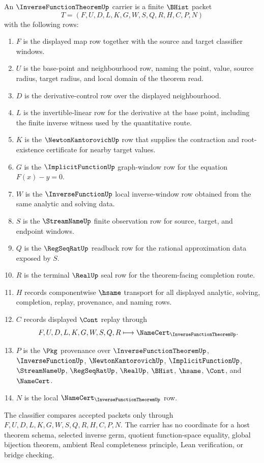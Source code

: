 \begin{definition}
\label{def:inverse-function-theorem-carrier}
An $\InverseFunctionTheoremUp$ carrier is a finite $\BHist$ packet
$$
T=(F,U,D,L,K,G,W,S,Q,R,H,C,P,N)
$$
with the following rows:
\begin{enumerate}
\item $F$ is the displayed map row together with the source and target classifier windows.
\item $U$ is the base-point and neighbourhood row, naming the point, value, source radius, target radius, and local domain of the theorem read.
\item $D$ is the derivative-control row over the displayed neighbourhood.
\item $L$ is the invertible-linear row for the derivative at the base point, including the finite inverse witness used by the quantitative route.
\item $K$ is the $\NewtonKantorovichUp$ row that supplies the contraction and root-existence certificate for nearby target values.
\item $G$ is the $\ImplicitFunctionUp$ graph-window row for the equation $F(x)-y=0$.
\item $W$ is the $\InverseFunctionUp$ local inverse-window row obtained from the same analytic and solving data.
\item $S$ is the $\StreamNameUp$ finite observation row for source, target, and endpoint windows.
\item $Q$ is the $\RegSeqRatUp$ readback row for the rational approximation data exposed by $S$.
\item $R$ is the terminal $\RealUp$ seal row for the theorem-facing completion route.
\item $H$ records componentwise $\hsame$ transport for all displayed analytic, solving, completion, replay, provenance, and naming rows.
\item $C$ records displayed $\Cont$ replay through
$$
F,U,D,L,K,G,W,S,Q,R \longmapsto \NameCert_{\InverseFunctionTheoremUp}.
$$
\item $P$ is the $\Pkg$ provenance over $\InverseFunctionTheoremUp$, $\InverseFunctionUp$, $\NewtonKantorovichUp$, $\ImplicitFunctionUp$, $\StreamNameUp$, $\RegSeqRatUp$, $\RealUp$, $\BHist$, $\hsame$, $\Cont$, and $\NameCert$.
\item $N$ is the local $\NameCert_{\InverseFunctionTheoremUp}$ row.
\end{enumerate}
The classifier compares accepted packets only through $F,U,D,L,K,G,W,S,Q,R,H,C,P,N$. The carrier has no coordinate for a host theorem schema, selected inverse germ, quotient function-space equality, global bijection theorem, ambient Real completeness principle, Lean verification, or bridge checking.
\end{definition}

